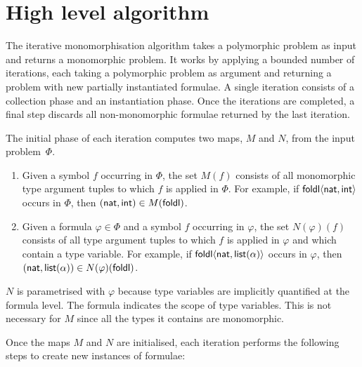 \documentclass[runningheads]{llncs}
\begin{document}
\section{High level algorithm}
\label{sec:high level-algorithm}

The iterative monomorphisation algorithm takes a polymorphic problem as input and returns a monomorphic problem. It works by applying a bounded number of iterations, each taking a polymorphic problem as argument and returning a problem with new partially instantiated formulae. A single iteration consists of a collection phase and an instantiation phase. Once the iterations are completed, a final step discards all non-monomorphic formulae returned by the last iteration.

The initial phase of each iteration computes two maps, \(M\) and \(N\), from the input problem~$\Phi$.
%
\begin{enumerate}
\item[\labelitemi] Given a symbol \(f\) occurring in \(\Phi\), the set \(M(f)\) consists of all monomorphic type argument tuples to which \(f\) is applied in \(\Phi\). For example, if \(\textsf{foldl}\langle \textsf{nat}, \textsf{int}\rangle\) occurs in \(\Phi\), then \((\textsf{nat}, \textsf{int}) \in M(\textsf{foldl}) \).

\item[\labelitemi] Given a formula \(\varphi \in \Phi\) and a symbol \(f\) occurring in \(\varphi\), the set \(N(\varphi)(f)\) consists of all type argument tuples to which \(f\) is applied in \(\varphi\) and which contain a type variable. For example, if \(\textsf{foldl}\langle \textsf{nat}, \textsf{list}(\alpha)\rangle\) occurs in \(\varphi\), then \((\textsf{nat}, \textsf{list}(\alpha)) \in N(\varphi)(\textsf{foldl}) \).
\end{enumerate}

\(N\) is parametrised with \(\varphi\) because type variables are implicitly quantified at the formula level. The formula indicates the scope of type variables. This is not necessary for \(M\) since all the types it contains are monomorphic.

Once the maps \(M\) and \(N\) are initialised, each iteration performs the following steps to create new instances of formulae:
\end{document}

